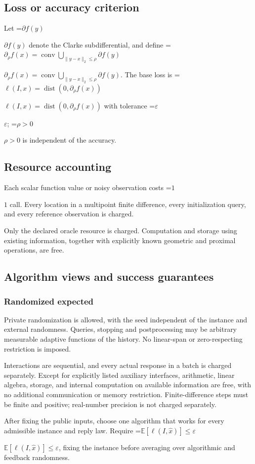 \documentclass[10pt,a4paper]{article}
\newcommand{\AtlasMath}[1]{\par\begingroup\centering\setbox0=\hbox{$\displaystyle #1$}\ifdim\wd0>1.4\linewidth\typeout{ATLAS WIDE FORMULA: \the\wd0}\fi\ifdim\wd0>\linewidth\resizebox{\linewidth}{!}{\box0}\else\box0\fi\par\endgroup}
\newcommand{\AtlasInlineMath}[1]{\begingroup\setbox0=\hbox{$#1$}\ifdim\wd0>.4\linewidth\endgroup\AtlasMath{#1}\else\endgroup$#1$\fi}
\begin{document}
\subsection{Loss or accuracy criterion}
Let \AtlasInlineMath{\partial f(y)} denote the Clarke subdifferential, and define \AtlasInlineMath{\partial_\rho f(x)=\operatorname{conv}\bigcup_{\|y-x\|_2\le\rho}\partial f(y)}. The base loss is \AtlasInlineMath{\ell(I,x)=\operatorname{dist}(0,\partial_\rho f(x))} with tolerance \AtlasInlineMath{\varepsilon}; \AtlasInlineMath{\rho>0} is independent of the accuracy.

\subsection{Resource accounting}
Each scalar function value or noisy observation costs \AtlasInlineMath{1} call. Every location in a multipoint finite difference, every initialization query, and every reference observation is charged.

Only the declared oracle resource is charged. Computation and storage using existing information, together with explicitly known geometric and proximal operations, are free.

\subsection{Algorithm views and success guarantees}
\subsubsection{Randomized expected}
Private randomization is allowed, with the seed independent of the instance and external randomness. Queries, stopping and postprocessing may be arbitrary measurable adaptive functions of the history. No linear-span or zero-respecting restriction is imposed.

Interactions are sequential, and every actual response in a batch is charged separately. Except for explicitly listed auxiliary interfaces, arithmetic, linear algebra, storage, and internal computation on available information are free, with no additional communication or memory restriction. Finite-difference steps must be finite and positive; real-number precision is not charged separately.

After fixing the public inputs, choose one algorithm that works for every admissible instance and reply law. Require \AtlasInlineMath{\mathbb{E}[\ell(I,\widehat{x})]\le \varepsilon}, fixing the instance before averaging over algorithmic and feedback randomness.
\end{document}
